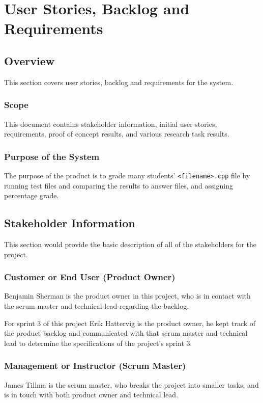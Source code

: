 \chapter{User Stories, Backlog and Requirements}
\section{Overview}


This section covers user stories, backlog and requirements for the system.  





\subsection{Scope}

This document contains stakeholder information, 
initial user stories, requirements, proof of concept results, and various research 
task results. 



\subsection{Purpose of the System}
The purpose of the product is to grade many students' {\tt <filename>.cpp} file by running test files and comparing the results to answer files, and assigning percentage grade.


\section{ Stakeholder Information}


This section would provide the basic description of all of the stakeholders for 
the project.

\subsection{Customer or End User (Product Owner)}
Benjamin Sherman is the product owner in this project, who is in contact with the scrum master and technical lead regarding the backlog. 

For sprint 3 of this project Erik Hattervig is the product owner, he kept track of the product backlog and communicated with that scrum master and technical lead to determine the specifications of the project’s sprint 3.

\subsection{Management or Instructor (Scrum Master)}
James Tillma is the scrum master, who breaks the project into smaller tasks, and is in touch with both product owner and technical lead.


